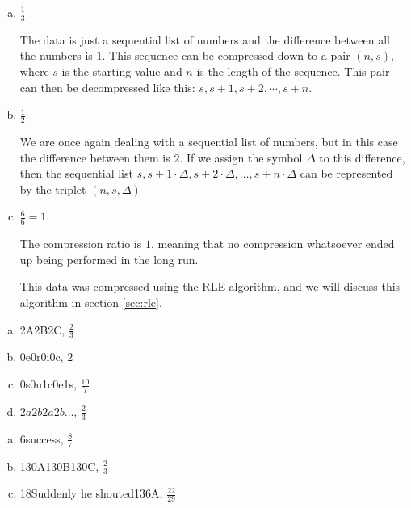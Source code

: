 \begin{Answer}[ref={compression-ratio}]

  \begin{enumerate}[(a)]
  \item $\frac{1}{3}$

    The data is just a sequential list of numbers and the difference
    between all the numbers is $1$. This sequence can be compressed
    down to a pair $(n,s)$, where $s$ is the starting value and $n$ is
    the length of the sequence. This pair can then be decompressed
    like this: $s,s+1,s+2,\cdots,s+n$.


  \item $\frac{1}{2}$

    We are once again dealing with a sequential list of numbers, but
    in this case the difference between them is $2$. If we assign the
    symbol $\Delta$ to this difference, then the sequential list $s, s
    + 1 \cdot \Delta, s + 2 \cdot \Delta, \dots, s + n \cdot \Delta$
    can be represented by the triplet $(n,s,\Delta)$

  \item $\frac{6}{6} = 1$.

    The compression ratio is $1$, meaning that no compression
    whatsoever ended up being performed in the long run.

    This data was compressed using the RLE algorithm, and we will
    discuss this algorithm in section \ref{sec:rle}.

  \end{enumerate}
\end{Answer}

\begin{Answer}[ref={rle-compression}]

  \begin{enumerate}[(a)]
  \item 2A2B2C, $\frac{2}{3}$
  \item 0e0r0i0c, $2$
  \item 0s0u1c0e1s, $\frac{10}{7}$
  \item $2a2b2a2b\dots$, $\frac{2}{3}$
  \end{enumerate}

\end{Answer}

\begin{Answer}[ref={packbits-rle}]

  \begin{enumerate}[(a)]
  \item 6success, $\frac{8}{7}$
  \item 130A130B130C, $\frac{2}{3}$
  \item 18Suddenly he shouted136A, $\frac{22}{29}$
  \end{enumerate}

\end{Answer}

\FloatBarrier
